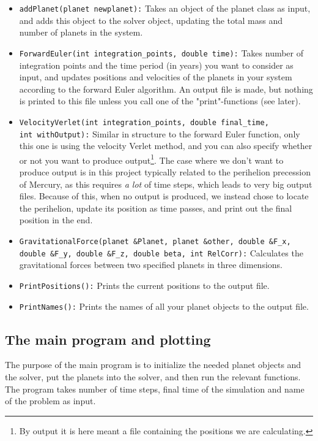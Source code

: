 \documentclass[12pt, a4paper]{article}
\begin{document}
\begin{itemize}
\item \texttt{addPlanet(planet newplanet):} Takes an object of the planet class as input, and adds this 
object to the solver object, updating the total mass and number of planets in the system. 
\item \texttt{ForwardEuler(int integration\_points, double time):} Takes number of integration points 
and the time period (in years) you want to consider as input, and updates positions and velocities of 
the planets in your system according to the forward Euler algorithm. An output file is made, but 
nothing is printed to this file unless you call one of the "print"-functions (see later). 
\item \texttt{VelocityVerlet(int integration\_points, double final\_time, \\ int withOutput):} Similar 
in structure to the forward Euler function, only this one is using the velocity Verlet method, and you can 
also specify whether or not you want to produce output\footnote{By output it is here meant a file 
containing the positions we are calculating.}. The case where we don't want to produce output is in this 
project typically related to the perihelion precession of Mercury, as this requires \textit{a lot} of 
time steps, which leads to very big output files. Because of this, when no output is produced, we 
instead chose to locate the perihelion, update its position as time passes, and print out the final 
position in the end.    
\item \texttt{GravitationalForce(planet \&Planet, planet \&other, double \&F\_x, \\ double \&F\_y, 
double \&F\_z, double beta, int RelCorr):} Calculates the gravitational forces between two specified 
planets in three dimensions.  
\item \texttt{PrintPositions():} Prints the current positions to the output file.    
\item \texttt{PrintNames():} Prints the names of all your planet objects to the output file. 
\end{itemize} 

\subsection{The main program and plotting}

The purpose of the main program is to initialize the needed planet objects and the solver, put the planets 
into the solver, and then run the relevant functions. The program takes number of time steps, 
final time of the simulation and name of the problem as input. 
\end{document}
